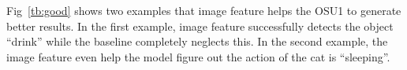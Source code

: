 Fig~\ref{tb:good} shows two examples that image feature helps the OSU1 to generate better results.
In the first example, image feature successfully detects the object ``drink'' while the baseline
completely neglects this.
In the second example, the image feature even help the model figure out the action of the cat is ``sleeping''.







